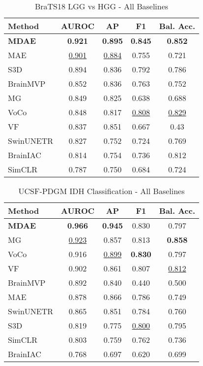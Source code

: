 \begin{table}[h!]
\centering
\caption{BraTS18 LGG vs HGG - All Baselines}
\label{tab:brats18_complete_baselines}
\begin{tabular}{lcccc}
\hline
Method & AUROC & AP & F1 & Bal. Acc. \\
\hline
\textbf{MDAE} & \textbf{0.921} & \textbf{0.895} & \textbf{0.845} & \textbf{0.852} \\
MAE & \underline{0.901} & \underline{0.884} & 0.755 & 0.721 \\
S3D & 0.894 & 0.836 & 0.792 & 0.786 \\
BrainMVP & 0.852 & 0.836 & 0.763 & 0.752 \\
MG & 0.849 & 0.825 & 0.638 & 0.688 \\
VoCo & 0.848 & 0.817 & \underline{0.808} & \underline{0.829} \\
VF & 0.837 & 0.851 & 0.667 & 0.43 \\
SwinUNETR & 0.827 & 0.752 & 0.724 & 0.769 \\
BrainIAC & 0.814 & 0.754 & 0.736 & 0.812 \\
SimCLR & 0.787 & 0.750 & 0.684 & 0.724 \\
\hline
\end{tabular}
\end{table}

\begin{table}[h!]
\centering
\caption{UCSF-PDGM IDH Classification - All Baselines}
\label{tab:ucsf_complete_baselines}
\begin{tabular}{lcccc}
\hline
Method & AUROC & AP & F1 & Bal. Acc. \\
\hline
\textbf{MDAE} & \textbf{0.966} & \textbf{0.945} & 0.830 & 0.797 \\
MG & \underline{0.923} & 0.857 & 0.813 & \textbf{0.858} \\
VoCo & 0.916 & \underline{0.899} & \textbf{0.830} & 0.797 \\
VF & 0.902 & 0.861 & 0.807 & \underline{0.812} \\
BrainMVP & 0.892 & 0.840 & 0.440 & 0.500 \\
MAE & 0.878 & 0.866 & 0.786 & 0.749 \\
SwinUNETR & 0.865 & 0.851 & 0.784 & 0.760 \\
S3D & 0.819 & 0.775 & \underline{0.800} & 0.795 \\
SimCLR & 0.803 & 0.759 & 0.762 & 0.736 \\
BrainIAC & 0.768 & 0.697 & 0.620 & 0.699 \\
\hline
\end{tabular}
\end{table}